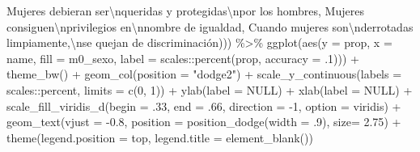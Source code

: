 \documentclass[
  12pt,
]{book}
\newenvironment{Shaded}{\begin{snugshade}}{\end{snugshade}}
\newcommand{\AttributeTok}[1]{\textcolor[rgb]{0.77,0.63,0.00}{#1}}
\newcommand{\ConstantTok}[1]{\textcolor[rgb]{0.00,0.00,0.00}{#1}}
\newcommand{\DecValTok}[1]{\textcolor[rgb]{0.00,0.00,0.81}{#1}}
\newcommand{\FloatTok}[1]{\textcolor[rgb]{0.00,0.00,0.81}{#1}}
\newcommand{\FunctionTok}[1]{\textcolor[rgb]{0.00,0.00,0.00}{#1}}
\newcommand{\NormalTok}[1]{#1}
\newcommand{\SpecialCharTok}[1]{\textcolor[rgb]{0.00,0.00,0.00}{#1}}
\newcommand{\StringTok}[1]{\textcolor[rgb]{0.31,0.60,0.02}{#1}}
\begin{document}
\begin{Shaded}
\begin{Highlighting}[]
                     \StringTok{\textquotesingle{}Mujeres debieran ser}\SpecialCharTok{\textbackslash{}n}\StringTok{queridas y protegidas}\SpecialCharTok{\textbackslash{}n}\StringTok{por los hombres\textquotesingle{}}\NormalTok{,}
                     \StringTok{\textquotesingle{}Mujeres consiguen}\SpecialCharTok{\textbackslash{}n}\StringTok{privilegios en}\SpecialCharTok{\textbackslash{}n}\StringTok{nombre de igualdad\textquotesingle{}}\NormalTok{,}
                     \StringTok{\textquotesingle{}Cuando mujeres son}\SpecialCharTok{\textbackslash{}n}\StringTok{derrotadas limpiamente,}\SpecialCharTok{\textbackslash{}n}\StringTok{se quejan de discriminación\textquotesingle{}}\NormalTok{))) }\SpecialCharTok{\%\textgreater{}\%}
  \FunctionTok{ggplot}\NormalTok{(}\FunctionTok{aes}\NormalTok{(}\AttributeTok{y =}\NormalTok{ prop, }\AttributeTok{x =}\NormalTok{ name, }\AttributeTok{fill =}\NormalTok{ m0\_sexo, }
             \AttributeTok{label =}\NormalTok{ scales}\SpecialCharTok{::}\FunctionTok{percent}\NormalTok{(prop, }\AttributeTok{accuracy =}\NormalTok{ .}\DecValTok{1}\NormalTok{))) }\SpecialCharTok{+}
  \FunctionTok{theme\_bw}\NormalTok{() }\SpecialCharTok{+} 
  \FunctionTok{geom\_col}\NormalTok{(}\AttributeTok{position =} \StringTok{"dodge2"}\NormalTok{) }\SpecialCharTok{+}
  \FunctionTok{scale\_y\_continuous}\NormalTok{(}\AttributeTok{labels =}\NormalTok{ scales}\SpecialCharTok{::}\NormalTok{percent,}
                     \AttributeTok{limits =} \FunctionTok{c}\NormalTok{(}\DecValTok{0}\NormalTok{, }\DecValTok{1}\NormalTok{)) }\SpecialCharTok{+}
  \FunctionTok{ylab}\NormalTok{(}\AttributeTok{label =} \ConstantTok{NULL}\NormalTok{) }\SpecialCharTok{+}
  \FunctionTok{xlab}\NormalTok{(}\AttributeTok{label =} \ConstantTok{NULL}\NormalTok{) }\SpecialCharTok{+}
  \FunctionTok{scale\_fill\_viridis\_d}\NormalTok{(}\AttributeTok{begin =}\NormalTok{ .}\DecValTok{33}\NormalTok{, }\AttributeTok{end =}\NormalTok{ .}\DecValTok{66}\NormalTok{, }\AttributeTok{direction =} \SpecialCharTok{{-}}\DecValTok{1}\NormalTok{, }\AttributeTok{option =} \StringTok{\textquotesingle{}viridis\textquotesingle{}}\NormalTok{) }\SpecialCharTok{+} 
  \FunctionTok{geom\_text}\NormalTok{(}\AttributeTok{vjust =} \SpecialCharTok{{-}}\FloatTok{0.8}\NormalTok{,}
            \AttributeTok{position =} \FunctionTok{position\_dodge}\NormalTok{(}\AttributeTok{width =}\NormalTok{ .}\DecValTok{9}\NormalTok{),}
            \AttributeTok{size=} \FloatTok{2.75}\NormalTok{)  }\SpecialCharTok{+}
  \FunctionTok{theme}\NormalTok{(}\AttributeTok{legend.position =} \StringTok{\textquotesingle{}top\textquotesingle{}}\NormalTok{,}
        \AttributeTok{legend.title =} \FunctionTok{element\_blank}\NormalTok{())  }
\end{Highlighting}
\end{Shaded}
\end{document}
